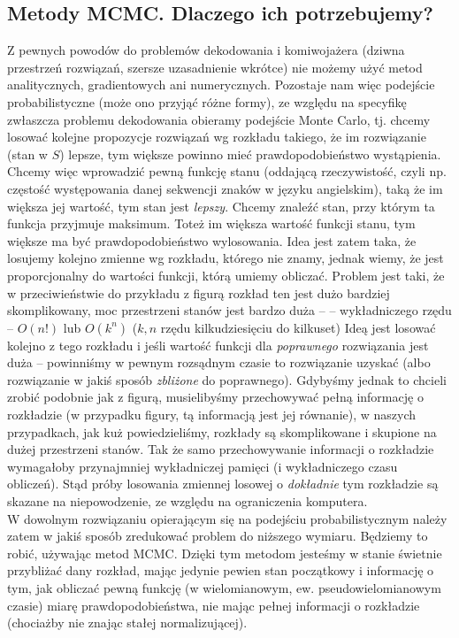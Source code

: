 \documentclass[a4paper]{article}
\begin{document}
\subsection{Metody MCMC. Dlaczego ich potrzebujemy?}
Z pewnych powodów do problemów dekodowania i komiwojażera (dziwna przestrzeń rozwiązań, szersze uzasadnienie wkrótce) nie możemy użyć metod analitycznych, gradientowych ani numerycznych. Pozostaje nam więc podejście probabilistyczne (może ono przyjąć różne formy), ze względu na specyfikę zwłaszcza problemu dekodowania obieramy podejście Monte Carlo, tj. chcemy losować kolejne propozycje rozwiązań wg rozkładu takiego, że im rozwiązanie (stan w $S$) lepsze, tym większe powinno mieć prawdopodobieństwo wystąpienia.
Chcemy więc wprowadzić pewną funkcję stanu (oddającą rzeczywistość, czyli np. częstość występowania danej sekwencji znaków w języku angielskim), taką że im większa jej wartość, tym stan jest \textit{lepszy}. Chcemy znaleźć stan, przy którym ta funkcja przyjmuje maksimum. Toteż im większa wartość funkcji stanu, tym większe ma być prawdopodobieństwo wylosowania. Idea jest zatem taka, że losujemy kolejno zmienne wg rozkładu, którego nie znamy, jednak wiemy, że jest proporcjonalny do wartości funkcji, którą umiemy obliczać. Problem jest taki, że w przeciwieństwie do przykładu z figurą rozkład ten jest dużo bardziej skomplikowany, moc przestrzeni stanów jest bardzo duża – – wykładniczego rzędu – $O(n!)$ lub $O(k^n)$ ($k, n$ rzędu kilkudziesięciu do kilkuset) Ideą jest losować kolejno z tego rozkładu i jeśli wartość funkcji dla \textit{poprawnego} rozwiązania jest duża – powinniśmy w pewnym rozsądnym czasie to rozwiązanie uzyskać (albo rozwiązanie w jakiś sposób \textit{zbliżone} do poprawnego). 
Gdybyśmy jednak to chcieli zrobić podobnie jak z figurą, musielibyśmy przechowywać pełną informację o rozkładzie (w przypadku figury, tą informacją jest jej równanie), w naszych przypadkach, jak kuż powiedzieliśmy, rozkłady są skomplikowane i skupione na dużej przestrzeni stanów. Tak że samo przechowywanie informacji o rozkładzie  wymagałoby przynajmniej wykładniczej pamięci (i wykładniczego czasu obliczeń). Stąd próby losowania zmiennej losowej o \textit{dokładnie} tym rozkładzie są skazane na niepowodzenie, ze względu na ograniczenia komputera.\\
W dowolnym rozwiązaniu opierającym się na podejściu probabilistycznym należy zatem w jakiś sposób zredukować problem do niższego wymiaru. Będziemy to robić, używając metod MCMC. Dzięki tym metodom jesteśmy w stanie świetnie przybliżać dany rozkład, mając jedynie pewien stan początkowy i informację o tym, jak obliczać pewną funkcję (w wielomianowym, ew. pseudowielomianowym czasie) miarę prawdopodobieństwa, nie mając pełnej informacji o rozkładzie (chociażby nie znając stałej normalizującej).
\end{document}
